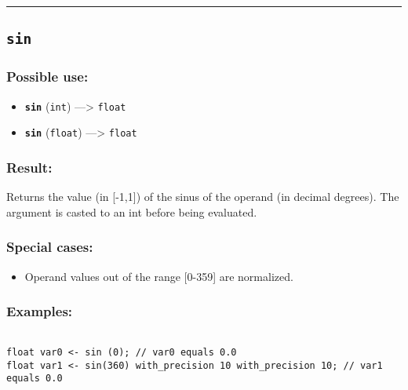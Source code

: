 \documentclass[]{book}
\providecommand{\tightlist}{%
  \setlength{\itemsep}{0pt}\setlength{\parskip}{0pt}}
\theoremstyle{definition}
\theoremstyle{definition}
\theoremstyle{definition}
\theoremstyle{remark}
\begin{document}
\begin{center}\rule{0.5\linewidth}{\linethickness}\end{center}

\subsection{\texorpdfstring{\texttt{sin}}{sin}}\label{sin}

\subsubsection{Possible use:}\label{possible-use-476}

\begin{itemize}
\tightlist
\item
  \textbf{\texttt{sin}} (\texttt{int}) ---\textgreater{} \texttt{float}
\item
  \textbf{\texttt{sin}} (\texttt{float}) ---\textgreater{}
  \texttt{float}
\end{itemize}

\subsubsection{Result:}\label{result-460}

Returns the value (in {[}-1,1{]}) of the sinus of the operand (in
decimal degrees). The argument is casted to an int before being
evaluated.

\subsubsection{Special cases:}\label{special-cases-122}

\begin{itemize}
\tightlist
\item
  Operand values out of the range {[}0-359{]} are normalized.
\end{itemize}

\subsubsection{Examples:}\label{examples-332}

\begin{verbatim}
 
float var0 <- sin (0); // var0 equals 0.0 
float var1 <- sin(360) with_precision 10 with_precision 10; // var1 equals 0.0
\end{verbatim}
\end{document}
